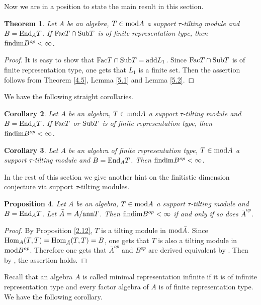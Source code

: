 \documentclass[a4paper]{amsart}
\newtheorem{thm}{Theorem}[section]
\newtheorem{cor}[thm]{Corollary}
\newtheorem{prop}[thm]{Proposition}
\theoremstyle{definition}
\theoremstyle{remark}
\numberwithin{equation}{section}
\begin{document}
  Now we are in a position to state the main result in this section.
  \begin{thm}\label{5.3} Let $A$ be an algebra, $T\in {\rm mod}A$ a support $\tau$-tilting module and $B={\rm End}_A T$. If ${\rm Fac}T\cap {\rm Sub}T$ is of finite representation type, then ${\rm findim}B^{op}<\infty$.
  \end{thm}

  \begin{proof} It is easy to show that ${\rm Fac}T\cap {\rm Sub}T={\rm add}L_1$. Since ${\rm Fac}T\cap {\rm Sub}T$ is of finite representation type, one gets that $L_1$ is a finite set. Then the assertion follows from Theorem \ref{4.5}, Lemma \ref{5.1} and Lemma \ref{5.2}.
\end{proof}

We have the following straight corollaries.

\begin{cor}\label{5.4} Let $A$ be an algebra, $T\in {\rm mod}A$ a support $\tau$-tilting module and $B={\rm End}_A T$. If ${\rm Fac}T$ or ${\rm Sub}T$ is of finite representation type, then ${\rm findim}B^{op}<\infty$.
\end{cor}

\begin{cor}\label{5.5} Let $A$ be an algebra of finite representation type, $T\in {\rm mod}A$ a support $\tau$-tilting module and $B={\rm End}_A T$. Then ${\rm findim}B^{op}<\infty$.
\end{cor}

In the rest of this section we give another hint on the finitistic dimension conjecture via support $\tau$-tilting modules.

\begin{prop}\label{5.6} Let $A$ be an algebra, $T\in {\rm mod}A$ a support $\tau$-tilting module and $B={\rm End}_A T$. Let $\bar{A}=A/{\rm ann}T$.
Then ${\rm findim}B^{op}<\infty$ if and only if so does $\bar{A}^{op}$.
\end{prop}
\begin{proof} By Proposition \ref{2.12}, $T$ is a tilting module in ${\rm mod}\bar{A}$. Since ${\rm Hom}_A(T, T)={\rm Hom}_{\bar{A}}(T, T)=B$, one gets that $T$ is also a tilting module in ${\rm mod}B^{op}$. Therefore one gets that $\bar{A}^{op}$ and $B^{op}$ are derived equivalent by \cite[Theorem 1.1]{R}. Then by \cite[Theorem 1.1]{PX}, the assertion holds.
\end{proof}

Recall that an algebra $A$ is called minimal representation infinite if it is of infinite representation type and every factor algebra of $A$ is of finite representation type. We have the following corollary.
\end{document}

